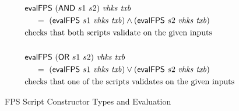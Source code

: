 \begin{figure*}[htb]
\begin{align*}
    & \mathsf{evalFPS} ~(\mathsf{AND}~s1~s2)~\mathit{vhks}~\mathit{txb}\\
    &~~~~ =~ (\mathsf{evalFPS}~s1~\mathit{vhks}~\mathit{txb}) \wedge (\mathsf{evalFPS}~s2~\mathit{vhks}~\mathit{txb})  \\
    & \text {checks that both scripts validate on the given inputs}  \\~\\
    & \mathsf{evalFPS} ~(\mathsf{OR}~s1~s2)~\mathit{vhks}~\mathit{txb}\\
    &~~~~ =~ (\mathsf{evalFPS}~s1~\mathit{vhks}~\mathit{txb}) \vee (\mathsf{evalFPS}~s2~\mathit{vhks}~\mathit{txb}) \\
    & \text{checks that one of the scripts validates on the given inputs}
  \end{align*}
  \caption{FPS Script Constructor Types and Evaluation}
  \label{fig:defs:tx-mc-eval}
\end{figure*}

